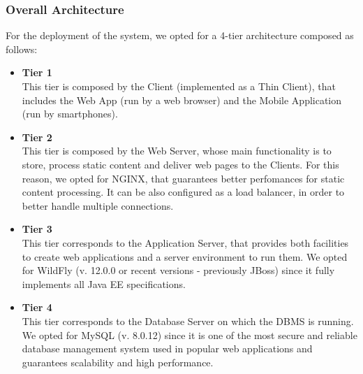 \documentclass[12pt,a4paper]{article}
\begin{document}
		\subsubsection{Overall Architecture}
			For the deployment of the system, we opted for a 4-tier architecture composed as follows:
			\begin{itemize}
				\item \textbf{Tier 1}\\
				This tier is composed by the Client (implemented as a Thin Client), that includes the Web App (run by a web browser) and the Mobile Application (run by smartphones). 
				\item \textbf{Tier 2}\\
				This tier is composed by the Web Server, whose main functionality is to store, process static content and deliver web pages to the Clients. For this reason, we opted for NGINX, that guarantees better perfomances for static content processing. It can be also configured as a load balancer, in order to better handle multiple connections.
				\item \textbf{Tier 3}\\
				This tier corresponds to the Application Server, that provides both facilities to create web applications and a server environment to run them. We opted for WildFly (v. 12.0.0 or recent versions - previously JBoss) since it fully implements all Java EE specifications.
				\item \textbf{Tier 4}\\
				This tier corresponds to the Database Server on which the DBMS is running. We opted for MySQL (v. 8.0.12) since it is one of the most secure and reliable database management system used in popular web applications and guarantees scalability and high performance.
			\end{itemize}
\end{document}
